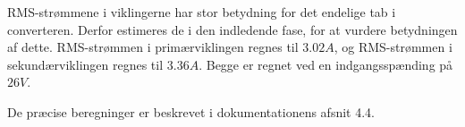 RMS-strømmene i viklingerne har stor betydning for det endelige tab i converteren. Derfor estimeres de i den indledende fase, for at vurdere betydningen af dette. RMS-strømmen i primærviklingen regnes til $3.02A$, og RMS-strømmen i sekundærviklingen regnes til $3.36A$. Begge er regnet ved en indgangsspænding på $26V$. 

\noindent De præcise beregninger er beskrevet i dokumentationens afsnit 4.4.







